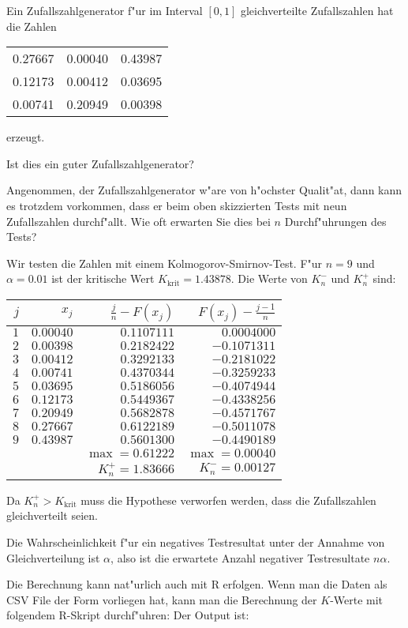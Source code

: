 Ein Zufallszahlgenerator f"ur im Interval $[0,1]$ gleichverteilte
Zufallszahlen hat die Zahlen
\begin{center}
\begin{tabular}{ccc}
0.27667& 0.00040& 0.43987\\
0.12173& 0.00412& 0.03695\\
0.00741& 0.20949& 0.00398
\end{tabular}
\end{center}
erzeugt.
\begin{teilaufgaben}
\item Ist dies ein guter Zufallszahlgenerator?
\item Angenommen, der Zufallszahlgenerator w"are von h"ochster
Qualit"at, dann kann es trotzdem vorkommen, dass er beim oben
skizzierten Tests mit neun Zufallszahlen durchf"allt.
Wie oft erwarten Sie dies bei $n$ Durchf"uhrungen des Tests?
\end{teilaufgaben}

\begin{loesung}
\begin{teilaufgaben}
\item
Wir testen die Zahlen mit einem Kolmogorov-Smirnov-Test.
F"ur $n=9$ und $\alpha=0.01$ ist der kritische Wert
$K_{\text{krit}}=1.43878$. Die Werte von
$K_n^-$ und $K_n^+$ sind:
\begin{center}
\begin{tabular}{|rrrr|}
\hline
$j$&$x_j$&$\frac{j}n-F(x_j)$&$F(x_j)-\frac{j-1}n$\\
\hline
$1$&$0.00040$&$0.1107111$&$ 0.0004000$\\
$2$&$0.00398$&$0.2182422$&$-0.1071311$\\
$3$&$0.00412$&$0.3292133$&$-0.2181022$\\
$4$&$0.00741$&$0.4370344$&$-0.3259233$\\
$5$&$0.03695$&$0.5186056$&$-0.4074944$\\
$6$&$0.12173$&$0.5449367$&$-0.4338256$\\
$7$&$0.20949$&$0.5682878$&$-0.4571767$\\
$8$&$0.27667$&$0.6122189$&$-0.5011078$\\
$9$&$0.43987$&$0.5601300$&$-0.4490189$\\
\hline
&&$\operatorname{max}=0.61222$&$\operatorname{max}= 0.00040$\\
&&$K_n^+=1.83666$&$K_n^-= 0.00127$\\
\hline
\end{tabular}
\end{center}
Da $K_n^+>K_{\text{krit}}$ muss die Hypothese verworfen werden, dass
die Zufallszahlen gleichverteilt seien.
\item Die Wahrscheinlichkeit f"ur ein negatives Testresultat unter der
Annahme von Gleichverteilung ist $\alpha$, also ist die erwartete Anzahl
negativer Testresultate $n\alpha$.
\end{teilaufgaben}
Die Berechnung kann nat"urlich auch mit R erfolgen. Wenn man die Daten
als CSV File der Form
vorliegen hat, kann man die Berechnung der $K$-Werte mit folgendem
R-Skript durchf"uhren:
Der Output ist:
\end{loesung}

